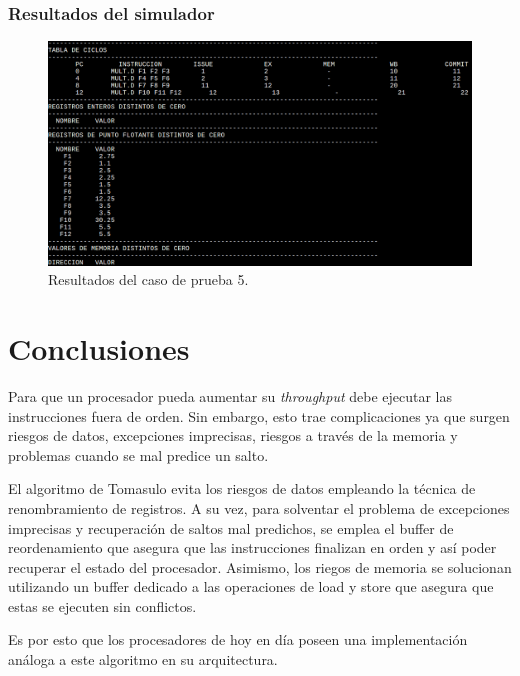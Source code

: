 \documentclass[a4paper]{article}
\begin{document}
	\subsubsection*{Resultados del simulador}

\begin{figure}[H]
	\centering
	\includegraphics[width=1\textwidth]{figures/test5.png}
	\caption{\label{fig:bloques}Resultados del caso de prueba 5.}
	\end{figure}


	\section{Conclusiones}
	
	Para que un procesador pueda aumentar su \textit{throughput} debe ejecutar las instrucciones fuera de orden. Sin embargo, esto trae complicaciones ya que surgen riesgos de datos, excepciones imprecisas, riesgos a través de la memoria y problemas cuando se mal predice un salto.
	
	El algoritmo de Tomasulo evita los riesgos de datos empleando la técnica de renombramiento de registros. A su vez, para solventar el problema de excepciones imprecisas y recuperación de saltos mal predichos, se emplea el buffer de reordenamiento que asegura que las instrucciones finalizan en orden y así poder recuperar el estado del procesador.	Asimismo, los riegos de memoria se solucionan utilizando un buffer dedicado a las operaciones de load y store que asegura que estas se ejecuten sin conflictos. 

	Es por esto que los procesadores de hoy en día poseen una implementación análoga a este algoritmo en su arquitectura. 

	
\end{document}
